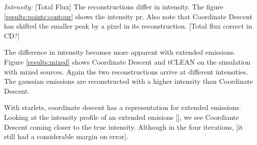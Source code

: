 \textit{Intensity:} [Total Flux] The reconstructions differ in intensity. The figure \ref{results:points:contour} shows the intensity pr. Also note that Coordinate Descent has shifted the smaller peak by a pixel in its reconstruction. [Total flux correct in CD?]



The difference in intensity becomes more apparent with extended emissions. Figure \ref{results:mixed} shows Coordinate Descent and tCLEAN on the simulation with mixed sources. Again the two reconstructions arrive at different intensities. The gaussian emissions are reconstructed with a higher intensity than Coordinate Descent.






With starlets, coordinate descent has a representation for extended emissions. Looking at the intensity profile of an extended emisions \ref{}, we see Coordiante Descent coming closer to the true intensity. Although in the four iterations,  [it still had a considerable margin on error]. 



